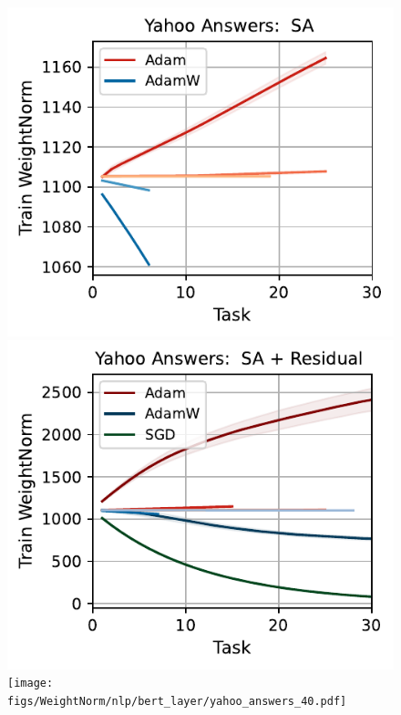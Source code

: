 \begin{figure}[htb!]
{        \includegraphics[width=\textwidth]{figs/WeightNorm/nlp/attention/yahoo_answers_40.pdf}
        \includegraphics[width=\textwidth]{figs/WeightNorm/nlp/attention_residual/yahoo_answers_40.pdf}
        \texttt{[image: figs/WeightNorm/nlp/bert\_layer/yahoo\_answers\_40.pdf]}
    }\\    \resizebox{\textwidth}{!}{
}
\end{figure}

